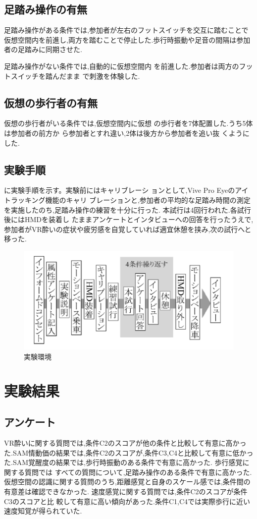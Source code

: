 \documentclass[uplatex]{jsarticle}   %
\begin{document}
\subsection{足踏み操作の有無}
足踏み操作がある条件では,参加者が左右のフットスイッチを交互に踏むことで仮想空間内を前進し,両方を踏むことで停止した.歩行時振動や足音の間隔は参加者の足踏みに同期させた.

足踏み操作がない条件では,自動的に仮想空間内
を前進した.参加者は両方のフットスイッチを踏んだまま
で刺激を体験した.

\subsection{仮想の歩行者の有無}
仮想の歩行者がいる条件では,仮想空間内に仮想
の歩行者を7体配置した.うち5体は参加者の前方か
ら参加者とすれ違い,2体は後方から参加者を追い抜
くようにした.



\subsection{実験手順}
に実験手順を示す。実験前にはキャリブレーシ
ョンとして,Vive Pro Eyeのアイトラッキング機能のキャリ
ブレーションと,参加者の平均的な足踏み時間の測定
を実施したのち,足踏み操作の練習を十分に行った.
本試行は4回行われた.各試行後にはHMDを装着し
たままアンケートとインタビューへの回答を行ったうえで,参加者がVR酔いの症状や疲労感を自覚していれば適宜休憩を挟み,次の試行へと移った.

\begin{figure}[h]
    \centering
    \includegraphics{rinkou_figure_4.png}
    \caption{実験環境}
    \label{fig:my_label_4}
\end{figure}
\section{実験結果}

\subsection{アンケート}
VR酔いに関する質問では,条件C2のスコアが他の条件と比較して有意に高かった.SAM\cite{文献18}情動価の結果では,条件C2のスコアが,条件C3,C4と比較して有意に低かった.SAM覚醒度の結果では,歩行時振動のある条件で有意に高かった.
歩行感覚に関する質問では すべての質問について,足踏み操作のある条件で有意に高かった.
仮想空間の認識に関する質問のうち,距離感覚と自身のスケール感では,条件間の有意差は確認できなかった.
速度感覚に関する質問では,条件C2のスコアが条件C3のスコアと比
較して有意に高い傾向があった.条件C1,C4では実際歩行に近い速度知覚が得られていた.
\end{document}
